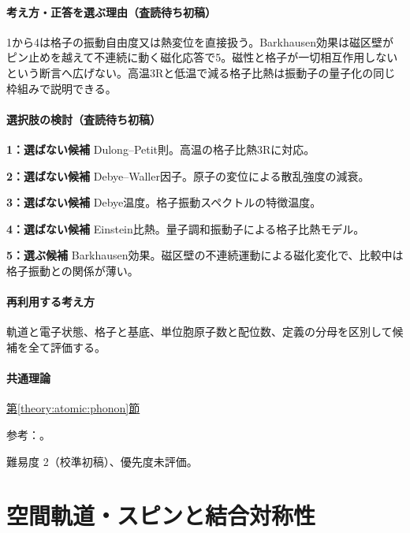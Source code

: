 \paragraph{考え方・正答を選ぶ理由（査読待ち初稿）} 1から4は格子の振動自由度又は熱変位を直接扱う。Barkhausen効果は磁区壁がピン止めを越えて不連続に動く磁化応答で5。磁性と格子が一切相互作用しないという断言へ広げない。高温3Rと低温で減る格子比熱は振動子の量子化の同じ枠組みで説明できる。

\paragraph{選択肢の検討（査読待ち初稿）}\mbox{}\par

\noindent\textbf{1：選ばない候補} Dulong–Petit則。高温の格子比熱3Rに対応。\par

\noindent\textbf{2：選ばない候補} Debye–Waller因子。原子の変位による散乱強度の減衰。\par

\noindent\textbf{3：選ばない候補} Debye温度。格子振動スペクトルの特徴温度。\par

\noindent\textbf{4：選ばない候補} Einstein比熱。量子調和振動子による格子比熱モデル。\par

\noindent\textbf{5：選ぶ候補} Barkhausen効果。磁区壁の不連続運動による磁化変化で、比較中は格子振動との関係が薄い。\par

\paragraph{再利用する考え方} 軌道と電子状態、格子と基底、単位胞原子数と配位数、定義の分母を区別して候補を全て評価する。

\paragraph{共通理論} \hyperref[theory:atomic:phonon]{第\ref*{theory:atomic:phonon}節}

\par 参考：\cite{atomic_phonon,atomic_barkhausen}。

\par 難易度 2（校準初稿）、優先度未評価。

\section{空間軌道・スピンと結合対称性}

